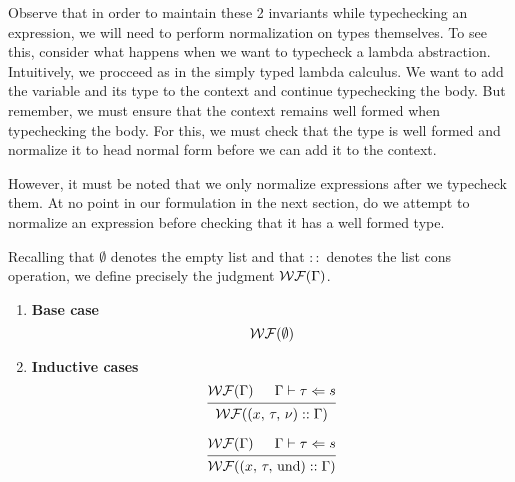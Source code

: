 \documentclass{article}
\begin{document}
Observe that in order to maintain these 2 invariants while typechecking
an expression,  we will need to perform normalization on types themselves.
To see this, consider what happens when we want to typecheck a lambda abstraction.
Intuitively, we procceed as in the simply typed lambda calculus. We want to add
the variable and its type to the context and continue typechecking the body.
But remember, we must ensure that the context remains well formed when
typechecking the body. For this, we must check that the type is well formed and
normalize it to head normal form before we can add it to the context.

However, it must be noted that we only normalize expressions after we typecheck
them. At no point in our formulation in the next section, do we attempt to
normalize an expression before checking that it has a well formed type.

\begin{definition} 
  Recalling that $\emptyset$ denotes the empty list and that $::$ denotes the list
  cons operation, we define precisely the judgment $\operatorname{\mathcal{WF}}(\Gamma)$.

  \begin{enumerate}
  \item \textbf{Base case} \\
    \[
      \begin{prooftree}
        \hypo{\wf(\emptyset)}
      \end{prooftree}
    \]

  \item \textbf{Inductive cases} \\
    \[
      \begin{prooftree}
        \hypo{\wf(\Gamma)}
        \hypo{\Gamma \vdash \tau \Leftarrow s}
        \infer2{\wf ((x, \, \tau, \, \nu) :: \Gamma)}
      \end{prooftree}
    \]

    \[
      \begin{prooftree}
        \hypo{\wf(\Gamma)}
        \hypo{\Gamma \vdash \tau \Leftarrow s}
        \infer2{\wf ((x, \, \tau, \, \text{und}) :: \Gamma)}
      \end{prooftree}
    \]
  \end{enumerate}
\end{definition}
\end{document}
